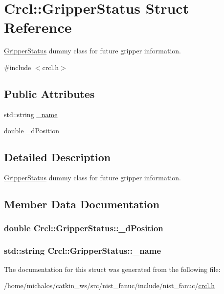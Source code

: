\hypertarget{structCrcl_1_1GripperStatus}{\section{Crcl\-:\-:Gripper\-Status Struct Reference}
\label{structCrcl_1_1GripperStatus}
}


\hyperlink{structCrcl_1_1GripperStatus}{Gripper\-Status} dummy class for future gripper information.  




{\ttfamily \#include $<$crcl.\-h$>$}

\subsection*{Public Attributes}
\begin{DoxyCompactItemize}
\item 
std\-::string \hyperlink{structCrcl_1_1GripperStatus_aa6975369bf9c1d3b7711940d8dd7441d}{\-\_\-name}
\item 
double \hyperlink{structCrcl_1_1GripperStatus_a206c61416e52e3b758130c6068545cb0}{\-\_\-d\-Position}
\end{DoxyCompactItemize}


\subsection{Detailed Description}
\hyperlink{structCrcl_1_1GripperStatus}{Gripper\-Status} dummy class for future gripper information. 

\subsection{Member Data Documentation}
\hypertarget{structCrcl_1_1GripperStatus_a206c61416e52e3b758130c6068545cb0}{
\subsubsection[{\-\_\-d\-Position}]{\setlength{\rightskip}{0pt plus 5cm}double Crcl\-::\-Gripper\-Status\-::\-\_\-d\-Position}}\label{structCrcl_1_1GripperStatus_a206c61416e52e3b758130c6068545cb0}
\hypertarget{structCrcl_1_1GripperStatus_aa6975369bf9c1d3b7711940d8dd7441d}{
\subsubsection[{\-\_\-name}]{\setlength{\rightskip}{0pt plus 5cm}std\-::string Crcl\-::\-Gripper\-Status\-::\-\_\-name}}\label{structCrcl_1_1GripperStatus_aa6975369bf9c1d3b7711940d8dd7441d}


The documentation for this struct was generated from the following file\-:\begin{DoxyCompactItemize}
\item 
/home/michalos/catkin\-\_\-ws/src/nist\-\_\-fanuc/include/nist\-\_\-fanuc/\hyperlink{crcl_8h}{crcl.\-h}\end{DoxyCompactItemize}
